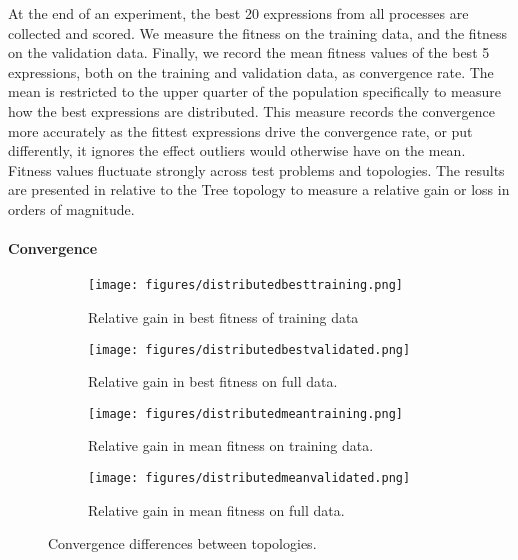 At the end of an experiment, the best 20 expressions from all processes are collected and scored. We measure the fitness on the training data, and the fitness on the validation data. 
Finally, we record the mean fitness values of the best 5 expressions, both on the training and validation data, as convergence rate.
The mean is restricted to the upper quarter of the population specifically to measure how the best expressions are distributed. %
This measure records the convergence more accurately as the fittest expressions drive the convergence rate, or put differently, it ignores the effect outliers would otherwise have on the mean.
Fitness values fluctuate strongly across test problems and topologies. The results are presented in relative to the Tree topology to measure a relative gain or loss in orders of magnitude.


\paragraph{Convergence}
\begin{figure*}
    \centering
    \begin{subfigure}{0.5\textwidth}
    \centering
        \texttt{[image: figures/distributedbesttraining.png]}
        \caption{Relative gain in best fitness of training data}
    \end{subfigure}%
    \begin{subfigure}{0.5\textwidth}
    \centering
        \texttt{[image: figures/distributedbestvalidated.png]}
        \caption{Relative gain in best fitness on full data.}
    \end{subfigure}
        \begin{subfigure}{0.5\textwidth}
    \centering
        \texttt{[image: figures/distributedmeantraining.png]}
        \caption{Relative gain in mean fitness on training data.}
    \end{subfigure}%
    \begin{subfigure}{0.5\textwidth}
    \centering
        \texttt{[image: figures/distributedmeanvalidated.png]}
        \caption{Relative gain in mean fitness on full data.}
    \end{subfigure}
    \caption{Convergence differences between topologies.}
    \label{fig:distributedresults}
\end{figure*}

